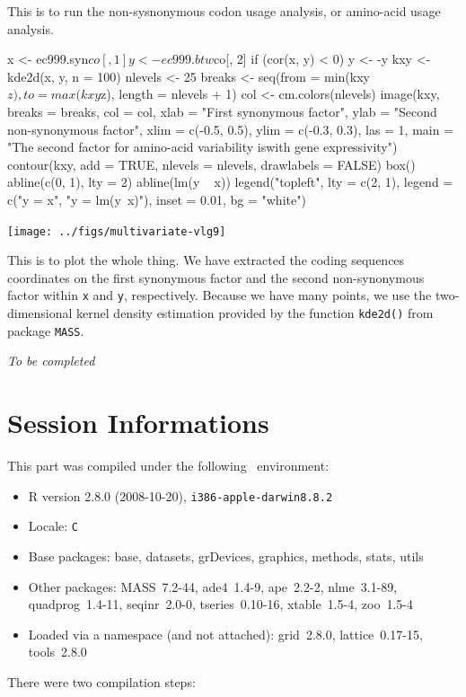 \documentclass{article}
\begin{document}
This is to run the non-sysnonymous codon usage analysis, or amino-acid usage analysis.

\begin{Schunk}
\begin{Sinput}
 x <- ec999.syn$co[, 1]
 y <- ec999.btw$co[, 2]
 if (cor(x, y) < 0) y <- -y
 kxy <- kde2d(x, y, n = 100)
 nlevels <- 25
 breaks <- seq(from = min(kxy$z), to = max(kxy$z), length = nlevels + 
     1)
 col <- cm.colors(nlevels)
 image(kxy, breaks = breaks, col = col, xlab = "First synonymous factor", 
     ylab = "Second non-synonymous factor", xlim = c(-0.5, 
         0.5), ylim = c(-0.3, 0.3), las = 1, main = "The second factor for amino-acid variability is\ncorrelated with gene expressivity")
 contour(kxy, add = TRUE, nlevels = nlevels, drawlabels = FALSE)
 box()
 abline(c(0, 1), lty = 2)
 abline(lm(y ~ x))
 legend("topleft", lty = c(2, 1), legend = c("y = x", "y = lm(y~x)"), 
     inset = 0.01, bg = "white")
\end{Sinput}
\end{Schunk}
\texttt{[image: ../figs/multivariate-vlg9]}

This is to plot the whole thing. We have extracted the coding sequences coordinates
on the first synonymous factor and the second non-synonymous factor within
\texttt{x} and \texttt{y}, respectively. Because we have many points, we
use the two-dimensional kernel density estimation provided by the function
\texttt{kde2d()} from package \texttt{MASS}.


%
%

\textit{To be completed}




\section*{Session Informations}

This part was compiled under the following \Rlogo{}~environment:

\begin{itemize}
  \item R version 2.8.0 (2008-10-20), \verb|i386-apple-darwin8.8.2|
  \item Locale: \verb|C|
  \item Base packages: base, datasets, grDevices, graphics, methods,
    stats, utils
  \item Other packages: MASS~7.2-44, ade4~1.4-9, ape~2.2-2,
    nlme~3.1-89, quadprog~1.4-11, seqinr~2.0-0, tseries~0.10-16,
    xtable~1.5-4, zoo~1.5-4
  \item Loaded via a namespace (and not attached): grid~2.8.0,
    lattice~0.17-15, tools~2.8.0
\end{itemize}
There were two compilation steps:
\end{document}
